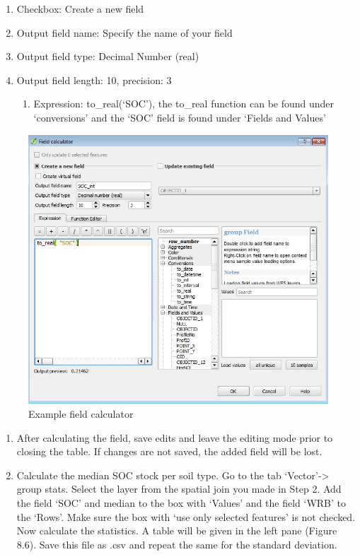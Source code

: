 \documentclass[10pt,b5paper,]{book}
\providecommand{\tightlist}{%
  \setlength{\itemsep}{0pt}\setlength{\parskip}{0pt}}
\theoremstyle{definition}
\theoremstyle{definition}
\theoremstyle{definition}
\theoremstyle{remark}
\begin{document}
\begin{enumerate}
\def\labelenumi{\alph{enumi}.}
\tightlist
\item
  Checkbox: Create a new field
\item
  Output field name: Specify the name of your field
\item
  Output field type: Decimal Number (real)
\item
  Output field length: 10, precision: 3

  \begin{enumerate}
  \def\labelenumii{\roman{enumii}.}
  \tightlist
  \item
    Expression: to\_real(`SOC'), the to\_real function can be found
    under `conversions' and the `SOC' field is found under `Fields and
    Values'
  \end{enumerate}
\end{enumerate}

\begin{figure}

{\centering \includegraphics[width=0.8\linewidth]{images/Conv_upscaling5} 

}

\caption{Example field calculator}\label{fig:unnamed-chunk-31}
\end{figure}

\begin{enumerate}
\def\labelenumi{\arabic{enumi}.}
\setcounter{enumi}{4}
\tightlist
\item
  After calculating the field, save edits and leave the editing mode
  prior to closing the table. If changes are not saved, the added field
  will be lost.
\item
  Calculate the median SOC stock per soil type. Go to the tab
  `Vector'-\textgreater{} group stats. Select the layer from the spatial
  join you made in Step 2. Add the field `SOC' and median to the box
  with `Values' and the field `WRB' to the `Rows'. Make sure the box
  with `use only selected features' is not checked. Now calculate the
  statistics. A table will be given in the left pane (Figure 8.6). Save
  this file as .csv and repeat the same for the standard deviation.
\end{enumerate}
\end{document}
